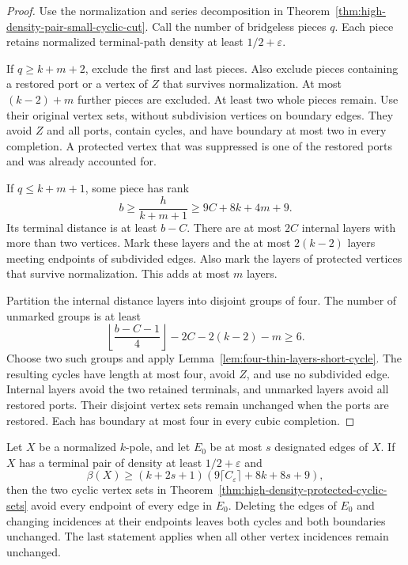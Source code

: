 \begin{proof}
Use the normalization and series decomposition in Theorem~\ref{thm:high-density-pair-small-cyclic-cut}.
Call the number of bridgeless pieces $q$.
Each piece retains normalized terminal-path density at least $1/2+\varepsilon$.

If $q\ge k+m+2$, exclude the first and last pieces.
Also exclude pieces containing a restored port or a vertex of $Z$ that survives normalization.
At most $(k-2)+m$ further pieces are excluded.
At least two whole pieces remain.
Use their original vertex sets, without subdivision vertices on boundary edges.
They avoid $Z$ and all ports, contain cycles, and have boundary at most two in every completion.
A protected vertex that was suppressed is one of the restored ports and was already accounted for.

If $q\le k+m+1$, some piece has rank
\[
 b\ge\frac h{k+m+1}\ge9C+8k+4m+9.
\]
Its terminal distance is at least $b-C$.
There are at most $2C$ internal layers with more than two vertices.
Mark these layers and the at most $2(k-2)$ layers meeting endpoints of subdivided edges.
Also mark the layers of protected vertices that survive normalization.
This adds at most $m$ layers.

Partition the internal distance layers into disjoint groups of four.
The number of unmarked groups is at least
\[
 \left\lfloor\frac{b-C-1}{4}\right\rfloor-2C-2(k-2)-m
 \ge6.
\]
Choose two such groups and apply Lemma~\ref{lem:four-thin-layers-short-cycle}.
The resulting cycles have length at most four, avoid $Z$, and use no subdivided edge.
Internal layers avoid the two retained terminals, and unmarked layers avoid all restored ports.
Their disjoint vertex sets remain unchanged when the ports are restored.
Each has boundary at most four in every cubic completion.
\end{proof}

\begin{corollary}
\label{cor:high-density-forbidden-edges}
Let $X$ be a normalized $k$-pole, and let $E_0$ be at most $s$ designated edges of $X$.
If $X$ has a terminal pair of density at least $1/2+\varepsilon$ and
\[
 \beta(X)\ge(k+2s+1)(9\lceil C_\varepsilon\rceil+8k+8s+9),
\]
then the two cyclic vertex sets in Theorem~\ref{thm:high-density-protected-cyclic-sets} avoid every endpoint of every edge in $E_0$.
Deleting the edges of $E_0$ and changing incidences at their endpoints leaves both cycles and both boundaries unchanged.
The last statement applies when all other vertex incidences remain unchanged.
\end{corollary}

